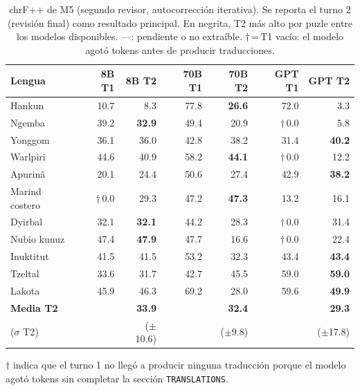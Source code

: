 \begin{table}[H]
	\centering
	\caption{chrF++ de M5 (segundo revisor, autocorrección iterativa). Se reporta el turno 2 (revisión final) como resultado principal. En negrita, T2 más alto por puzle entre los modelos disponibles. {\color{gray}---}: pendiente o no extraíble. $\dagger$\,=\,T1 vacío: el modelo agotó tokens antes de producir traducciones.}
	\label{tab:resultados_m5}
	{\fontsize{10pt}{11.5pt}\selectfont
		\begin{tabular*}{0.98\textwidth}{@{\extracolsep{\fill}} lrrrrrr}
			\toprule
			\textbf{Lengua}
			& \textbf{8B T1} & \textbf{8B T2}
			& \textbf{70B T1} & \textbf{70B T2}
			& \textbf{GPT T1} & \textbf{GPT T2} \\
			\midrule
			Hankun         & 10.7 & 8.3               & 77.8 & \textbf{26.6} & 72.0           & 3.3  \\
			Ngemba         & 39.2 & \textbf{32.9}     & 49.4 & 20.9          & $\dagger$\,0.0 & 5.8  \\
			Yonggom        & 36.1 & 36.0              & 42.8 & 38.2          & 31.4           & \textbf{40.2} \\
			Warlpiri       & 44.6 & 40.9              & 58.2 & \textbf{44.1} & $\dagger$\,0.0 & 12.2 \\
			Apurinã        & 20.1 & 24.4              & 50.6 & 27.4          & 42.9           & \textbf{38.2} \\
			Marind costero & $\dagger$\,0.0 & 29.3     & 47.2 & \textbf{47.3} & 13.2           & 16.1 \\
			Dyirbal        & 32.1 & \textbf{32.1}     & 44.2 & 28.3          & $\dagger$\,0.0 & 31.4 \\
			Nubio kunuz    & 47.4 & \textbf{47.9}     & 47.7 & 16.6          & $\dagger$\,0.0 & 22.4 \\
			Inuktitut      & 41.5 & 41.5              & 53.2 & 32.3          & 43.4           & \textbf{43.4} \\
			Tzeltal        & 33.6 & 31.7              & 42.7 & 45.5          & 59.0           & \textbf{59.0} \\
			Lakota         & 45.9 & 46.3              & 69.2 & 28.0          & 59.6           & \textbf{49.9} \\
			\midrule
			\textbf{Media T2} & & \textbf{33.9} & & \textbf{32.4} & & \textbf{29.3} \\
			($\sigma$ T2)    & & ($\pm$10.6)   & & ($\pm$9.8)    & & ($\pm$17.8) \\
			\bottomrule
		\end{tabular*}
	}
	\smallskip
	
	{\footnotesize $\dagger$ indica que el turno 1 no llegó a producir ninguna traducción porque el modelo agotó tokens sin completar la sección \texttt{TRANSLATIONS}.}
\end{table}

